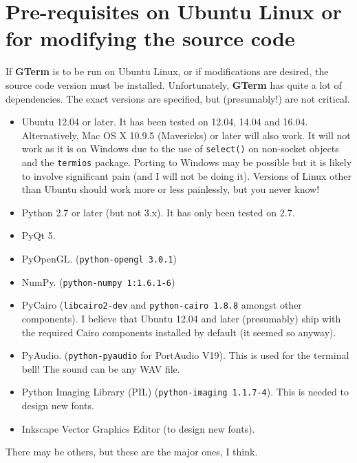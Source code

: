 \documentclass[a4paper,twoside,11pt]{article}
\begin{document}
\section{Pre-requisites on Ubuntu Linux or for modifying the source code}
If \textbf{GTerm} is to be run on Ubuntu Linux, or if modifications are desired, the source code version must be installed.
Unfortunately, \textbf{GTerm} has quite a lot of dependencies. The exact versions are specified, but (presumably!) are not critical.
\begin{itemize}
\item Ubuntu 12.04 or later. It has been tested on 12.04, 14.04 and 16.04.  Alternatively, Mac OS X 10.9.5 (Mavericks) or later
	will also work. It will not work as it is on Windows due to the use of
      \texttt{select()} on non-socket objects and the \texttt{termios} package. 
       Porting to Windows may be possible but it is likely to involve significant pain (and I will not be doing it).
       	Versions of Linux other than Ubuntu should work more or less painlessly, but you never know!
\item Python 2.7 or later (but not 3.x). It has only been tested on 2.7.
\item PyQt 5.
\item PyOpenGL. (\texttt{python-opengl 3.0.1})
\item NumPy. (\texttt{python-numpy 1:1.6.1-6})
\item PyCairo (\texttt{libcairo2-dev} and \texttt{python-cairo 1.8.8} amongst other components). I believe that Ubuntu 12.04
      and later (presumably) ship with the required Cairo components installed by default (it seemed so anyway).
\item PyAudio. (\texttt{python-pyaudio} for PortAudio V19). This is used for the terminal bell! The sound can be any WAV file.
\item Python Imaging Library (PIL) (\texttt{python-imaging 1.1.7-4}). This is needed to design new fonts.
\item Inkscape Vector Graphics Editor (to design new fonts).
\end{itemize}
There may be others, but these are the major ones, I think.
\end{document}
